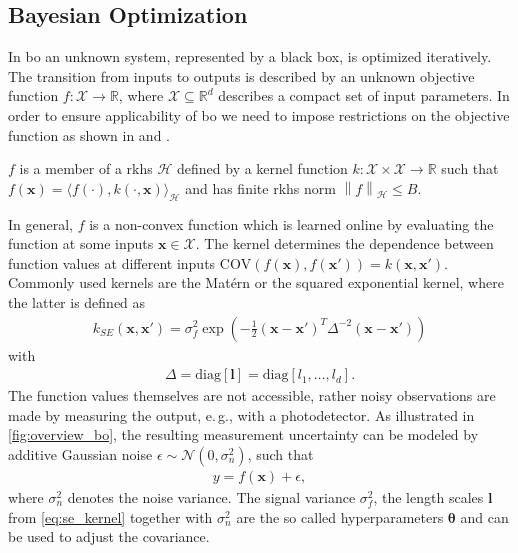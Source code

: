 \documentclass{ifacconf}
\newcommand{\eg}{e.\,g., }
\newcommand{\norm}[1]{\left\lVert#1\right\rVert}
\newcommand{\bx}{\bm{x}}
\begin{document}
\subsection{Bayesian Optimization}
In \acrlong{bo} an unknown system, represented by a black box, is optimized iteratively. The transition from inputs to outputs is described by an unknown objective function \(f:\mathcal{X} \longrightarrow \mathbb{R}\), where \(\mathcal{X} \subseteq \mathbb{R}^d\) describes a compact set of input parameters. In order to ensure applicability of \gls{bo} we need to impose restrictions on the objective function as shown in \cite{lineBO} and \cite{kanagawa2018}.
\begin{assum}
\(f\) is a member of a \gls{rkhs} \(\mathcal{H}\) defined by a kernel function \(k:\mathcal{X}\times\mathcal{X} \longrightarrow \mathbb{R}\) such that \(f(\bx) = \langle f(\cdot),k(\cdot,\bx)\rangle_\mathcal{H}\) and has finite \gls{rkhs} norm \(\norm{f}_\mathcal{H}\leq B\).
\label{assum:1}
\end{assum}
 In general, \(f\) is a non-convex function which is learned online by evaluating the function at some inputs  \( \bm{x}\in\mathcal{X}\).
The kernel determines the dependence between function values at different inputs \(\mathrm{COV}(f(\bm{x}),f(\bm{x}'))=k(\bm{x},\bm{x}')\). Commonly used kernels are the Mat\'ern or the squared exponential kernel, where the latter is defined as 
\begin{align}
    k_{SE}(\bx,\bx') = \sigma_f^2\exp\left(-\frac{1}{2}(\bx-\bx')^T\Delta^{-2}(\bx-\bx')\right)
    \label{eq:se_kernel}     	
\end{align}
with
\begin{align}
    \Delta = \mathrm{diag}[\bm{l}] = \mathrm{diag}[l_1,\dots,l_d].
    \label{eq:delta}  
\end{align} 
The function values themselves are not accessible, rather noisy observations are made by measuring the output, \eg with a photodetector. As illustrated in \cref{fig:overview_bo}, the resulting measurement uncertainty can be modeled by additive Gaussian noise \(\epsilon \sim \mathcal{N}(0,\sigma_n^2)\), such that
\begin{align}
    y = f(\bx)+\epsilon,
    \label{eq:y_composed}
\end{align}
where \(\sigma_n^2\) denotes the noise variance. The signal variance \(\sigma_f^2\), the length scales \(\bm{l}\) from \eqref{eq:se_kernel} together with \(\sigma_n^2\) are the so called hyperparameters \(\bm{\theta}\) and can be used to adjust the covariance.
\end{document}
